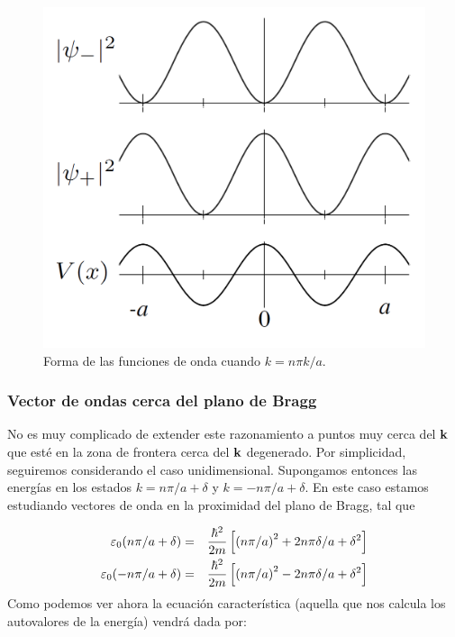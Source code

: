 \begin{figure}[h!] \centering
	\includegraphics[scale=0.35]{Cuerpo/Ch_07/Oxford-01.png}
	\caption{Forma de las funciones de onda cuando $k=n\pi k/a$.}
	\label{Fig:07-01}
\end{figure}    

\subsubsection{Vector de ondas cerca del plano de Bragg}

No es muy complicado de extender este razonamiento a puntos muy cerca del $\mathbf{k}$ que esté en la zona de frontera cerca del $\mathbf{k}$ degenerado. Por simplicidad, seguiremos considerando el caso unidimensional. Supongamos entonces las energías en los estados $k=n\pi/a+\delta$ y $k=-n\pi/a+\delta$. En este caso estamos estudiando vectores de onda en la proximidad del plano de Bragg, tal que

\begin{eqnarray}
	\varepsilon_0 (n\pi/a + \delta) & = & \frac{\hbar^2}{2m} \left[ \left( n\pi/a \right)^2 + 2 n \pi \delta / a + \delta^2 \right] \\
	\varepsilon_0 (-n\pi/a + \delta) & = & \frac{\hbar^2}{2m} \left[ \left( n\pi/a \right)^2 - 2 n \pi \delta / a + \delta^2 \right]
\end{eqnarray}	
Como podemos ver ahora la ecuación característica (aquella que nos calcula los autovalores de la energía) vendrá dada por:

